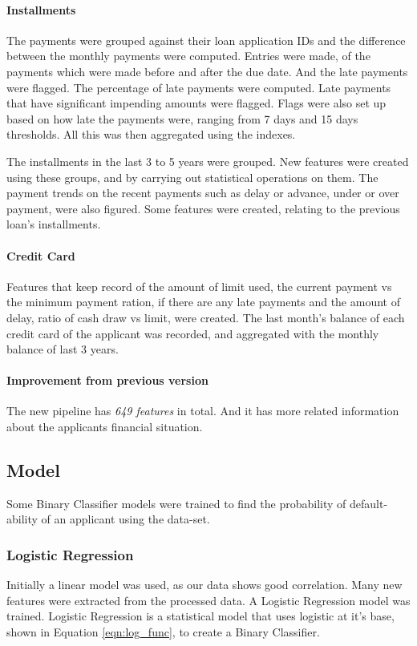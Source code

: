 \documentclass[sigconf, nonacm]{acmart}
\begin{document}
\paragraph{Installments}

The payments were grouped against their loan application IDs and the difference between the monthly payments were computed. Entries were made, of the payments which were made before and after the due date. And the late payments were flagged. The percentage of late payments were computed. Late payments that have significant impending amounts were flagged. Flags were also set up based on how late the payments were, ranging from 7 days and 15 days thresholds. All this was then aggregated using the indexes.

The installments in the last 3 to 5 years were grouped. New features were created using these groups, and by carrying out statistical operations on them. The payment trends on the recent payments such as delay or advance, under or over payment, were also figured. Some features were created, relating to the previous loan's installments.

\paragraph{Credit Card}

Features that keep record of the amount of limit used, the current payment vs the minimum payment ration, if there are any late payments and the amount of delay, ratio of cash draw vs limit, were created. The last month's balance of each credit card of the applicant was recorded, and aggregated with the monthly balance of last 3 years.

\paragraph{Improvement from previous version}

The new pipeline has \emph{649 features} in total. And it has more related information about the applicants financial situation.

\subsection{Model}
Some Binary Classifier models were trained to find the probability of default-ability of an applicant using the data-set.

\subsubsection{Logistic Regression} \label{subsubsec:log_reg}
Initially a linear model was used, as our data shows good correlation. Many new features were extracted from the processed data. A Logistic Regression\cite{10.1001/jama.2016.7653} model was trained. Logistic Regression is a statistical model that uses logistic at it's base, shown in Equation \ref{eqn:log_func}, to create a Binary Classifier.
\end{document}
